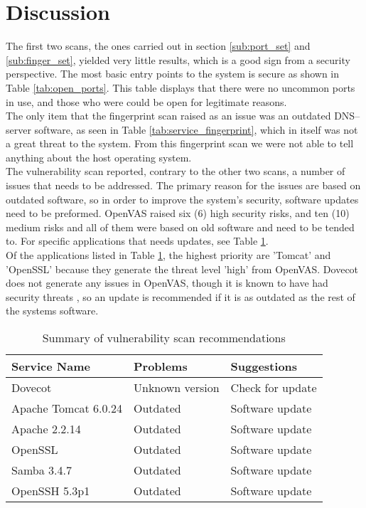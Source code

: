 \section{Discussion} \label{sec:discussion}

\noindent The first two scans, the ones carried out in section \ref{sub:port_set} and \ref{sub:finger_set}, yielded very little results, which is a good sign from a security perspective. The most basic entry points to the system is secure as shown in Table \ref{tab:open_ports}. This table displays that there were no uncommon ports in use, and those who were could be open for legitimate reasons. \\


\noindent The only item that the fingerprint scan raised as an issue was an outdated DNS--server software, as seen in Table \ref{tab:service_fingerprint}, which in itself was not a great threat to the system. From this fingerprint scan we were not able to tell anything about the host operating system. \\

\noindent The vulnerability scan reported, contrary to the other two scans, a number of issues that needs to be addressed. The primary reason for the issues are based on outdated software, so in order to improve the system's security, software updates need to be preformed. OpenVAS raised six (6) high security risks, and ten (10) medium risks and all of them were based on old software and need to be tended to. For specific applications that needs updates, see Table \ref{tab:recommendations}. \\

\noindent Of the applications listed in Table \ref{tab:recommendations}, the highest priority are 'Tomcat' and 'OpenSSL' because they generate the threat level 'high' from OpenVAS. Dovecot does not generate any issues in OpenVAS, though it is known to have had security threats \cite{dovecot}, so an update is recommended if it is as outdated as the rest of the systems software.\\



\begin{table}[htb]
 \centering
 \caption{Summary of vulnerability scan recommendations} 
 \label{tab:recommendations}
 \begin{tabular}{m{5cm}p{4cm}p{4cm}} \toprule
 \textbf{Service Name} & \textbf{Problems} & \textbf{Suggestions} \\ \midrule
    Dovecot                 &   Unknown version &  Check for update\\
    Apache Tomcat 6.0.24    &   Outdated &  Software update\\
    Apache 2.2.14           &   Outdated &  Software update\\
    OpenSSL                 &   Outdated &  Software update\\
    Samba 3.4.7             &   Outdated &  Software update\\
    OpenSSH 5.3p1           &   Outdated &  Software update\\ \bottomrule
 \end{tabular} 
\end{table}

